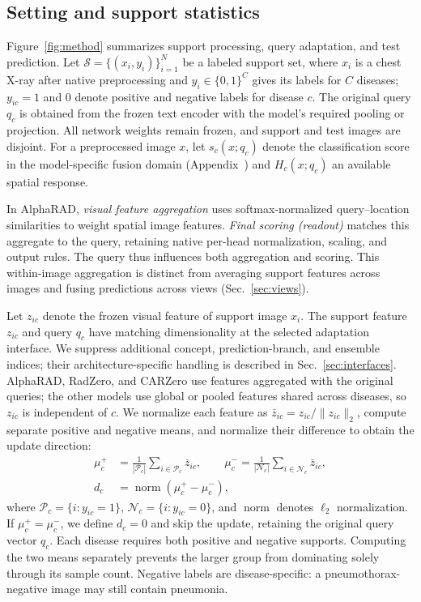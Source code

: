 \documentclass[10pt,twocolumn,letterpaper]{article}
\newcommand{\norm}[1]{\operatorname{norm}\!\left(#1\right)}
\begin{document}
\subsection{Setting and support statistics}
\label{sec:support}
Figure~\ref{fig:method} summarizes support processing, query adaptation, and test prediction. Let $\mathcal S=\{(x_i,y_i)\}_{i=1}^{N}$ be a labeled support set, where $x_i$ is a chest X-ray after native preprocessing and $y_i\in\{0,1\}^{C}$ gives its labels for $C$ diseases; $y_{ic}=1$ and $0$ denote positive and negative labels for disease $c$. The original query $q_c$ is obtained from the frozen text encoder with the model's required pooling or projection. All network weights remain frozen, and support and test images are disjoint. For a preprocessed image $x$, let $s_c(x;q_c)$ denote the classification score in the model-specific fusion domain (Appendix~) and $H_c(x;q_c)$ an available spatial response.

In AlphaRAD, \emph{visual feature aggregation} uses softmax-normalized query--location similarities to weight spatial image features. \emph{Final scoring (readout)} matches this aggregate to the query, retaining native per-head normalization, scaling, and output rules. The query thus influences both aggregation and scoring. This within-image aggregation is distinct from averaging support features across images and fusing predictions across views (Sec.~\ref{sec:views}).

Let $z_{ic}$ denote the frozen visual feature of support image $x_i$. The support feature $z_{ic}$ and query $q_c$ have matching dimensionality at the selected adaptation interface. We suppress additional concept, prediction-branch, and ensemble indices; their architecture-specific handling is described in Sec.~\ref{sec:interfaces}. AlphaRAD, RadZero, and CARZero use features aggregated with the original queries; the other models use global or pooled features shared across diseases, so $z_{ic}$ is independent of $c$. We normalize each feature as $\bar z_{ic}=z_{ic}/\|z_{ic}\|_2$, compute separate positive and negative means, and normalize their difference to obtain the update direction:
\begin{equation}
\begin{split}
\mu_c^+ &= \frac{1}{|\mathcal P_c|}\sum_{i\in\mathcal P_c}\bar z_{ic},\qquad
\mu_c^- = \frac{1}{|\mathcal N_c|}\sum_{i\in\mathcal N_c}\bar z_{ic},\\
d_c &= \norm{\mu_c^+-\mu_c^-},
\end{split}
\label{eq:direction}
\end{equation}
where $\mathcal P_c=\{i:y_{ic}=1\}$, $\mathcal N_c=\{i:y_{ic}=0\}$, and $\operatorname{norm}$ denotes $\ell_2$ normalization. If $\mu_c^+=\mu_c^-$, we define $d_c=0$ and skip the update, retaining the original query vector $q_c$. Each disease requires both positive and negative supports. Computing the two means separately prevents the larger group from dominating solely through its sample count. Negative labels are disease-specific: a pneumothorax-negative image may still contain pneumonia.
\end{document}

